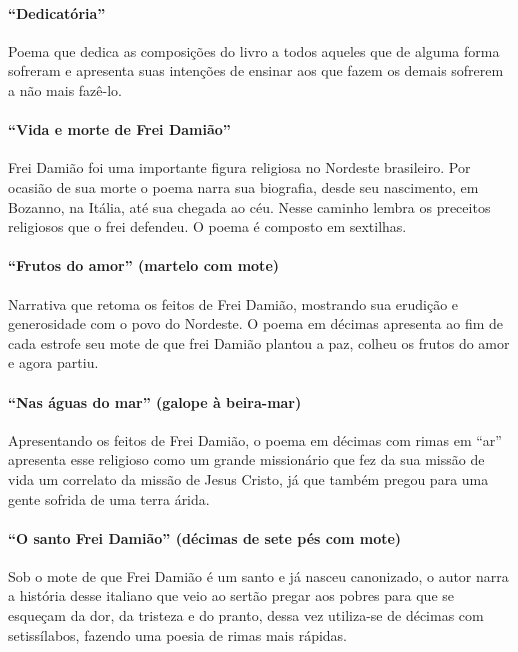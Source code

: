 \paragraph{``Dedicatória''}

Poema que dedica as composições do livro a todos aqueles que de alguma
forma sofreram e apresenta suas intenções de ensinar aos que fazem os
demais sofrerem a não mais fazê-lo.

\paragraph{``Vida e morte de Frei Damião''}

Frei Damião foi uma importante figura religiosa no Nordeste brasileiro.
Por ocasião de sua morte o poema narra sua biografia, desde seu nascimento,
em Bozanno, na Itália, até sua chegada ao céu. Nesse caminho lembra os
preceitos religiosos que o frei defendeu. O poema é composto em
sextilhas.

\paragraph{``Frutos do amor'' (martelo com mote)}

Narrativa que retoma os feitos de Frei Damião, mostrando sua erudição e
generosidade com o povo do Nordeste. O poema em décimas apresenta ao
fim de cada estrofe seu mote de que frei Damião plantou a paz, colheu
os frutos do amor e agora partiu.

\paragraph{``Nas águas do mar'' (galope à beira-mar)}

Apresentando os feitos de Frei Damião, o poema em décimas com rimas em
``ar'' apresenta esse religioso como
um grande missionário que fez da sua missão de vida um correlato da missão de
Jesus Cristo, já que também pregou para uma gente sofrida de uma terra
árida.

\paragraph{``O santo Frei Damião'' (décimas de sete pés com mote)}

Sob o mote de que Frei Damião é um santo e já nasceu canonizado, o autor
narra a história desse italiano que veio ao sertão pregar aos pobres
para que se esqueçam da dor, da tristeza e do pranto, dessa vez
utiliza-se de décimas com setissílabos, fazendo uma poesia de rimas
mais rápidas.

